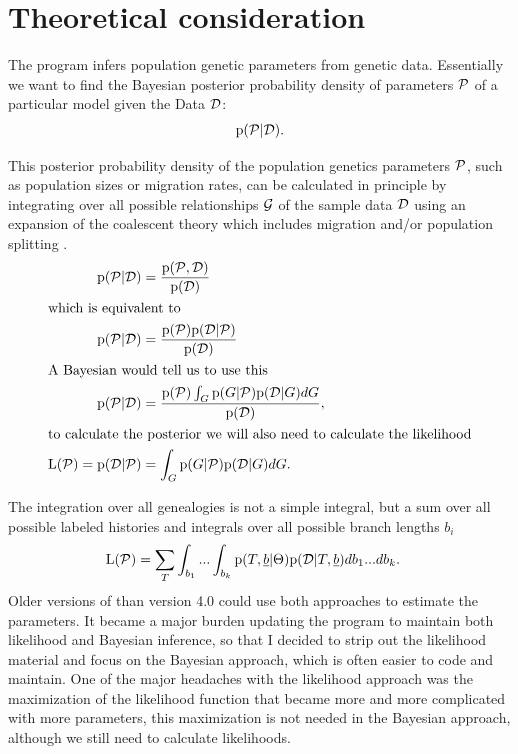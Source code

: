 \chapter{Theoretical consideration}
The program \migrate infers population genetic parameters from genetic data. Essentially we want to find the  Bayesian posterior probability density of parameters $\P$ of a particular model given the Data $\Dd$:
\begin{align}
   \prob(\P | \Dd). \notag
\end{align} 

This posterior probability density of the population genetics parameters $\P$, 
such as population sizes or migration rates, can be calculated in principle by integrating over all possible 
relationships 
$\G$ 
of the sample data 
$\Dd$ 
using   an expansion of the coalescent theory \citep{kingman1982-27,kingman1982-235,kingman2000-1461} which
includes migration \citep{hudson1991-1,nath1993-841,notohara1990-59} and/or population splitting \citep[for example, ][]{nielsen:1998:mle}.
\begin{align}
\prob(\P | \Dd) &=  \frac{\prob( \P, \Dd)}{\prob(\Dd)} \\
\intertext{which is equivalent to}
\prob(\P | \Dd) &=  \frac{\prob(\P) \prob( \Dd | \P)}{\prob(\Dd)}\\
\intertext{A Bayesian would tell us to use this}
\label{BAYES}
\prob(\P | \Dd) &=  \frac{\prob(\P) \int_G \prob(G | \P) \prob( \Dd | G)dG}{\prob(\Dd)},  \\ 
\intertext{to calculate the posterior we will also need to calculate the likelihood}
\label{LIKELIHOOD}  
{\rm L}(\P) = \prob(\Dd | \P) &=   \int_G \prob(G | \P) \prob( \Dd | G)dG.   
\end{align}
 
 The integration over all genealogies is not a simple integral, but a sum over all possible labeled histories and integrals over all possible branch lengths $b_i$
\begin{align}
{\rm L}(\P) &= \sum_T \int_{b_1} ... \int_{b_k} \prob(T,\underline{b} | \Theta) \prob(\Dd | T,\underline{b}) db_1...db_k.
\end{align}
Older versions of \migrate than version 4.0 could use both approaches to estimate the parameters. It became a major burden updating the program to maintain both likelihood and Bayesian inference, so that I decided to strip out the likelihood material and focus on the Bayesian approach, which is often easier to code and maintain. One of the major headaches with the likelihood approach was the maximization of the likelihood function that became more and more complicated with more parameters, this maximization is not needed in the Bayesian approach, although we still need to calculate likelihoods.

